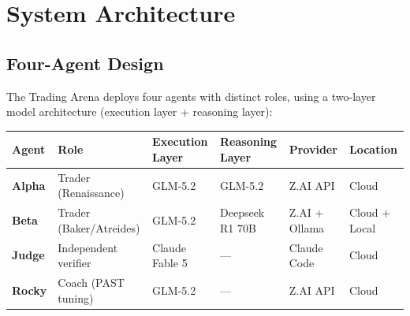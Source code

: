 \documentclass[11pt]{article}
\begin{document}
\section{System Architecture}\label{system-architecture}

\subsection{Four-Agent Design}\label{four-agent-design}

The Trading Arena deploys four agents with distinct roles, using a two-layer model architecture (execution layer + reasoning layer):

{\def\LTcaptype{none} %
{\small
\begin{longtable}{@{}
  >{\raggedright\arraybackslash}p{}
  >{\raggedright\arraybackslash}p{}
  >{\raggedright\arraybackslash}p{}
  >{\raggedright\arraybackslash}p{}
  >{\raggedright\arraybackslash}p{}
  >{\raggedright\arraybackslash}p{}@{}}
\toprule\noalign{}
\begin{minipage}[b]{\linewidth}\raggedright
Agent
\end{minipage} & \begin{minipage}[b]{\linewidth}\raggedright
Role
\end{minipage} & \begin{minipage}[b]{\linewidth}\raggedright
Execution Layer
\end{minipage} & \begin{minipage}[b]{\linewidth}\raggedright
Reasoning Layer
\end{minipage} & \begin{minipage}[b]{\linewidth}\raggedright
Provider
\end{minipage} & \begin{minipage}[b]{\linewidth}\raggedright
Location
\end{minipage} \\
\midrule\noalign{}
\endhead
\bottomrule\noalign{}
\endlastfoot
\renewcommand{\arraystretch}{1.15}
\textbf{Alpha} & Trader (Renaissance) & GLM-5.2 & GLM-5.2 & Z.AI API & Cloud \\
\textbf{Beta} & Trader (Baker/Atreides) & GLM-5.2 & Deepseek R1 70B & Z.AI + Ollama & Cloud + Local \\
\textbf{Judge} & Independent verifier & Claude Fable 5 & --- & Claude Code & Cloud \\
\textbf{Rocky} & Coach (PAST tuning) & GLM-5.2 & --- & Z.AI API & Cloud \\
\end{longtable}}
}
\end{document}
